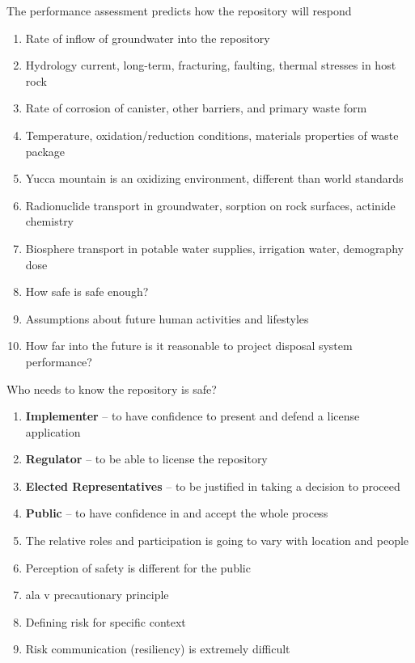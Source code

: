 \documentclass[aspectratio=1610,pdftex,dvipsnames,compress,xcolor={dvipsnames}]{beamer}
\newcommand{\acs}{\acrshort} %
\begin{document}
\begin{frame}{The performance assessment predicts how the repository will respond}
    \begin{enumerate}[series=outerlist,topsep=0pt,itemsep=11pt,leftmargin=*,label=(\arabic*)]
        \item[]Rate of inflow of groundwater into the repository
        \item[]Hydrology current, long-term, fracturing, faulting, thermal stresses in host rock
        \item[]Rate of corrosion of canister, other barriers, and primary waste form
        \item[]Temperature, oxidation/reduction conditions, materials properties of waste package
        \item[]Yucca mountain is an oxidizing environment, different than world standards
        \item[]Radionuclide transport in groundwater, sorption on rock surfaces, actinide chemistry
        \item[]Biosphere transport in potable water supplies, irrigation water, demography dose 
        \item[]How safe is safe enough?
        \item[]Assumptions about future human activities and lifestyles
        \item[]How far into the future is it reasonable to project disposal system performance?
    \end{enumerate}
\end{frame}


\begin{frame}{Who needs to know the repository is safe?}
    \begin{enumerate}[series=outerlist,topsep=0pt,itemsep=11pt,leftmargin=*,label=(\arabic*)]
        \item[]\textbf{Implementer} -- to have confidence to present and defend a license application
        \item[]\textbf{Regulator} -- to be able to license the repository
        \item[]\textbf{Elected Representatives} -- to be justified in taking a decision to proceed
        \item[]\textbf{Public} -- to have confidence in and accept the whole process
        \item[]The relative roles and participation is going to vary with location and people
        \item[]Perception of safety is different for the public
        \item[]\acs{ala} v precautionary principle
        \item[]Defining risk for specific context
        \item[]Risk communication (resiliency) is extremely difficult
    \end{enumerate}
\end{frame}
\end{document}
